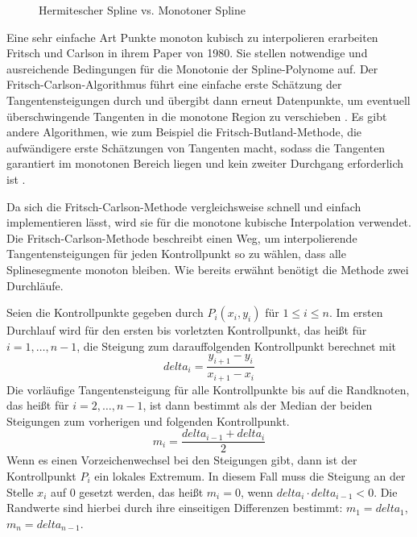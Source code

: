 \begin{figure}[H]
    \center
    \caption{Hermitescher Spline vs. Monotoner Spline}\label{fig:diffmonotone}
\end{figure}

Eine sehr einfache Art Punkte monoton kubisch zu interpolieren erarbeiten Fritsch und Carlson in ihrem Paper von 1980. Sie stellen notwendige und ausreichende Bedingungen für die Monotonie der Spline-Polynome auf. Der Fritsch-Carlson-Algorithmus führt eine einfache erste Schätzung der Tangentensteigungen durch und übergibt dann erneut Datenpunkte, um eventuell überschwingende Tangenten in die monotone Region zu verschieben \cite{Fritschcarlson:1980}. Es gibt andere Algorithmen, wie zum Beispiel die Fritsch-Butland-Methode, die aufwändigere erste Schätzungen von Tangenten macht, sodass die Tangenten garantiert im monotonen Bereich liegen und kein zweiter Durchgang erforderlich ist \cite{Fritschbutland:1984}.

Da sich die Fritsch-Carlson-Methode vergleichsweise schnell und einfach implementieren lässt, wird sie für die monotone kubische Interpolation verwendet. Die Fritsch-Carlson-Methode beschreibt einen Weg, um interpolierende Tangentensteigungen für jeden Kontrollpunkt so zu wählen, dass alle Splinesegmente monoton bleiben. Wie bereits erwähnt benötigt die Methode zwei Durchläufe. 

Seien die Kontrollpunkte gegeben durch $P_i(x_i,y_i)$ für $1\le i \le n$.
Im ersten Durchlauf wird für den ersten bis vorletzten Kontrollpunkt, das heißt für $i=1,\dots,n-1$, die Steigung zum darauffolgenden Kontrollpunkt berechnet mit 
$$delta_i=\frac{y_{i+1}-y_i}{x_{i+1}-x_i}$$
Die vorläufige Tangentensteigung für alle Kontrollpunkte bis auf die Randknoten, das heißt für $i=2,\dots,n-1$, ist dann bestimmt als der Median der beiden Steigungen zum vorherigen und folgenden Kontrollpunkt.
$$m_i=\frac{delta_{i-1}+delta_i}{2}$$
Wenn es einen Vorzeichenwechsel bei den Steigungen gibt, dann ist der Kontrollpunkt $P_i$ ein lokales Extremum. In diesem Fall muss die Steigung an der Stelle $x_i$ auf $0$ gesetzt werden, das heißt
$m_i=0$, wenn $delta_i\cdot delta_{i-1} < 0$.
Die Randwerte sind hierbei durch ihre einseitigen Differenzen bestimmt:
$m_1=delta_1$, $m_{n}=delta_{n-1}$.

